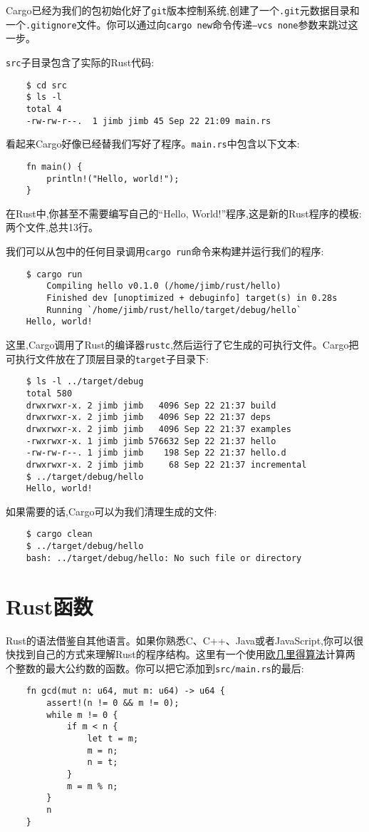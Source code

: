 Cargo已经为我们的包初始化好了\texttt{git}版本控制系统,创建了一个\texttt{.git}元数据目录和一个\texttt{.gitignore}文件。你可以通过向\texttt{cargo new}命令传递\texttt{--vcs none}参数来跳过这一步。

\texttt{src}子目录包含了实际的Rust代码:
\begin{verbatim}
    $ cd src
    $ ls -l
    total 4
    -rw-rw-r--.  1 jimb jimb 45 Sep 22 21:09 main.rs
\end{verbatim}

看起来Cargo好像已经替我们写好了程序。\texttt{main.rs}中包含以下文本:
\begin{verbatim}
    fn main() {
        println!("Hello, world!");
    }
\end{verbatim}

在Rust中,你甚至不需要编写自己的“Hello, World!”程序,这是新的Rust程序的模板:两个文件,总共13行。

我们可以从包中的任何目录调用\texttt{cargo run}命令来构建并运行我们的程序:
\begin{verbatim}
    $ cargo run
        Compiling hello v0.1.0 (/home/jimb/rust/hello)
        Finished dev [unoptimized + debuginfo] target(s) in 0.28s
        Running `/home/jimb/rust/hello/target/debug/hello`
    Hello, world!
\end{verbatim}

这里,Cargo调用了Rust的编译器\texttt{rustc},然后运行了它生成的可执行文件。Cargo把可执行文件放在了顶层目录的\texttt{target}子目录下:
\begin{verbatim}
    $ ls -l ../target/debug
    total 580
    drwxrwxr-x. 2 jimb jimb   4096 Sep 22 21:37 build
    drwxrwxr-x. 2 jimb jimb   4096 Sep 22 21:37 deps
    drwxrwxr-x. 2 jimb jimb   4096 Sep 22 21:37 examples
    -rwxrwxr-x. 1 jimb jimb 576632 Sep 22 21:37 hello
    -rw-rw-r--. 1 jimb jimb    198 Sep 22 21:37 hello.d
    drwxrwxr-x. 2 jimb jimb     68 Sep 22 21:37 incremental
    $ ../target/debug/hello
    Hello, world!
\end{verbatim}

如果需要的话,Cargo可以为我们清理生成的文件:
\begin{verbatim}
    $ cargo clean
    $ ../target/debug/hello
    bash: ../target/debug/hello: No such file or directory
\end{verbatim}

\section{Rust函数}
Rust的语法借鉴自其他语言。如果你熟悉C、C++、Java或者JavaScript,你可以很快找到自己的方式来理解Rust的程序结构。这里有一个使用\href{https://en.wikipedia.org/wiki/Euclidean_algorithm}{欧几里得算法}计算两个整数的最大公约数的函数。你可以把它添加到\texttt{src/main.rs}的最后:
\begin{verbatim}
    fn gcd(mut n: u64, mut m: u64) -> u64 {
        assert!(n != 0 && m != 0);
        while m != 0 {
            if m < n {
                let t = m;
                m = n;
                n = t;
            }
            m = m % n;
        }
        n
    }
\end{verbatim}

